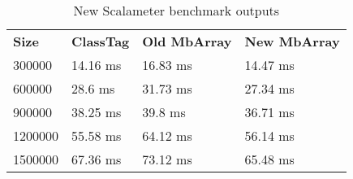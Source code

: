 \begin{table}[t]
  \begin{tabularx}{0.48\textwidth}{|g *{3}{|Y}|} \hline
    \textbf{Size} & \textbf{ClassTag} & \textbf{Old MbArray}& \textbf{New MbArray} \\
    300000		&              14.16 ms &              16.83 ms &             14.47 ms \\
    600000		&              28.6 ms 	&              31.73 ms &             27.34 ms \\
    900000      &              38.25 ms &              39.8 ms 	&             36.71 ms \\
    1200000     &              55.58 ms &              64.12 ms &             56.14 ms \\ 
    1500000     &              67.36 ms &              73.12 ms &             65.48 ms \\ \hline
  \end{tabularx}
  \vspace{-2mm}
  \caption{New Scalameter benchmark outputs}
  \label{table:NewCTvsMB}
  \vspace{-1em}
\end{table}
